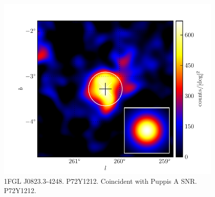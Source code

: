 \documentclass[preprint]{aastex}
\renewcommand{\deg}{\ensuremath{^\circ}\xspace}
\begin{document}
\begin{figure}
  \begin{center}
    \includegraphics[type=pdf,ext=.pdf,read=.pdf]{source_plots/source_1FGL_J0823.3-4248}
  \end{center}
  \caption{1FGL J0823.3-4248. P72Y1212. Coincident with Puppis A SNR.
  P72Y1212.
  }\label{1FGL_J0823.3-4248}
\end{figure}
\end{document}
